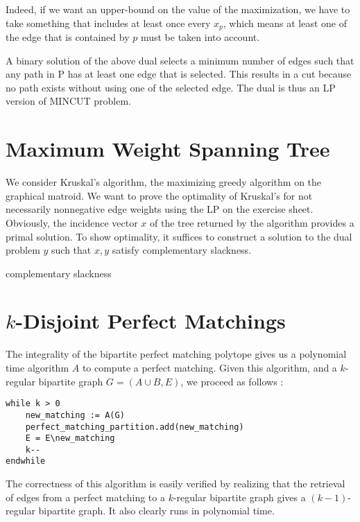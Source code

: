 \documentclass{scrartcl}
\newcommand\1{\mathbf{1}}
\begin{document}
Indeed, if we want an upper-bound on the value of the maximization, we have to take something that includes at least once every $x_p$, which means at least one of the edge that is contained by $p$ must be taken into account. 

A binary solution of the above dual selects a minimum number of edges such that any path in P has at least one edge that is selected. This results in a cut because no path exists without using one of the selected edge. The dual is thus an LP version of MINCUT problem.

\section{Maximum Weight Spanning Tree}
We consider Kruskal's algorithm, the maximizing greedy algorithm on the graphical matroid. We want to prove the optimality of Kruskal's for not necessarily nonnegative edge weights using the LP on the exercise sheet. Obviously, the incidence vector $x$ of the tree returned by the algorithm provides a primal solution. To show optimality, it suffices to construct a solution to the dual problem $y$ such that $x,y$ satisfy complementary slackness.

\begin{description}
\item[complementary slackness]
\end{description}


\section{$k$-Disjoint Perfect Matchings}

The integrality of the bipartite perfect matching polytope gives us a polynomial time algorithm $A$ to compute a perfect matching. Given this algorithm, and a $k$-regular bipartite graph $G = (A \cup B,E)$, we proceed as follows :

\begin{verbatim}
while k > 0
    new_matching := A(G) 
    perfect_matching_partition.add(new_matching)
    E = E\new_matching
    k--
endwhile
\end{verbatim}

The correctness of this algorithm is easily verified by realizing that the retrieval of edges from a perfect matching to a $k$-regular bipartite graph gives a $(k-1)$-regular bipartite graph. It also clearly runs in polynomial time.
\end{document}
